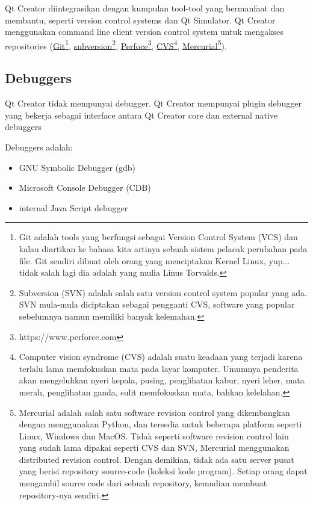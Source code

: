 Qt Creator diintegrasikan dengan kumpulan tool-tool yang bermanfaat dan
membantu, seperti version control systems dan Qt Simulator. Qt Creator
menggunakan command line client version control system untuk mengakses
repositories (\href{https://git-scm.com/}{Git}\footnote{Git adalah tools yang berfungsi sebagai Version Control System (VCS) dan kalau diartikan ke bahasa kita artinya sebuah sistem pelacak perubahan pada file. Git sendiri dibuat oleh orang yang menciptakan Kernel Linux, yup... tidak salah lagi dia adalah yang mulia Linus Torvalds.},
\href{https://subversion.apache.org/}{subversion}\footnote{Subversion (SVN) adalah salah satu version control system popular yang ada. SVN mula-mula diciptakan sebagai pengganti CVS, software yang popular sebelumnya namun memiliki banyak kelemahan.},
\href{https://www.perforce.com}{Perfoce}\footnote{https://www.perforce.com},
\href{www.nongnu.org/cvs/}{CVS}\footnote{Computer vision syndrome (CVS) adalah suatu keadaan yang terjadi karena terlalu lama memfokuskan mata pada layar komputer. Umumnya penderita akan mengeluhkan nyeri kepala, pusing, penglihatan kabur, nyeri leher, mata merah, penglihatan ganda, sulit memfokuskan mata, bahkan kelelahan.},
\href{https://www.mercurial-scm.org}{Mercurial}\footnote{Mercurial adalah salah satu software revision control yang dikembangkan dengan menggunakan Python, dan tersedia untuk beberapa platform seperti Linux, Windows dan MacOS.  Tidak seperti software revision control lain yang sudah lama dipakai seperti CVS dan SVN, Mercurial menggunakan distributed revision control.  Dengan demikian, tidak ada satu server pusat yang berisi repository source-code (koleksi kode program).  Setiap orang dapat mengambil source code dari sebuah repository, kemudian membuat repository-nya sendiri.}).

\subsection{Debuggers}\label{debuggers}

Qt Creator tidak mempunyai debugger. Qt Creator mempunyai plugin
debugger yang bekerja sebagai interface antara Qt Creator core dan
external native debuggers

Debuggers adalah:

\begin{itemize}
\tightlist
\item
  GNU Symbolic Debugger (gdb)
\item
  Microsoft Console Debugger (CDB)
\item
  internal Java Script debugger
\end{itemize}

